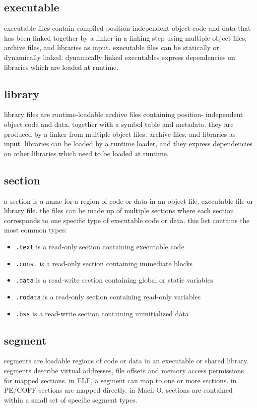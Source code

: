 \subsection{executable}
executable files contain compiled position-independent object code and
data that has been linked together by a linker in a linking step
using multiple object files, archive files, and libraries as input.
executable files can be statically or dynamically linked. dynamically
linked executables express dependencies on libraries which are
loaded at runtime.

\subsection{library}
library files are runtime-loadable archive files containing position-%
independent object code and data, together with a symbol table and metadata.
they are produced by a linker from multiple object files, archive files, and
libraries as input. libraries can be loaded by a runtime loader, and they
express dependencies on other libraries which need to be loaded at runtime.

\subsection{section}
a section is a name for a region of code or data in an object file,
executable file or library file. the files can be made up of
multiple sections where each section corresponds to one specific type of
executable code or data. this list contains the most common types:

\begin{itemize}[itemsep=0pt]
\item \texttt{.text} is a read-only section containing executable code
\item \texttt{.const} is a read-only section containing immediate blocks
\item \texttt{.data} is a read-write section containing global or static variables
\item \texttt{.rodata} is a read-only section containing read-only variables
\item \texttt{.bss} is a read-write section containing uninitialized data
\end{itemize}

\subsection{segment}
segments are loadable regions of code or data in an executable or shared
library. segments describe virtual addresses, file offsets and memory access
permissions for mapped sections. in ELF, a segment can map to one or more
sections. in PE/COFF sections are mapped directly. in Mach-O, sections are
contained within a small set of specific segment types.

